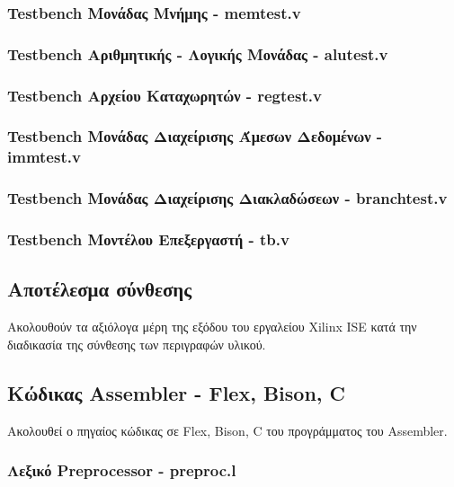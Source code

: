 \documentclass[11pt]{extarticle}
\begin{document}
\subsubsection{Testbench Μονάδας Μνήμης - memtest.v}

\newpage
\subsubsection{Testbench Αριθμητικής - Λογικής Μονάδας - alutest.v}


\subsubsection{Testbench Αρχείου Καταχωρητών - regtest.v}


\subsubsection{Testbench Μονάδας Διαχείρισης Άμεσων Δεδομένων - immtest.v}


\subsubsection{Testbench Μονάδας Διαχείρισης Διακλαδώσεων - branchtest.v}


\newpage
\subsubsection{Testbench Μοντέλου Επεξεργαστή - tb.v}


\subsection{Αποτέλεσμα σύνθεσης}
Ακολουθούν τα αξιόλογα μέρη της εξόδου του εργαλείου Xilinx ISE κατά την διαδικασία της σύνθεσης των περιγραφών υλικού.


\subsection{Κώδικας Assembler - Flex, Bison, C}
Ακολουθεί ο πηγαίος κώδικας σε Flex, Bison, C του προγράμματος του Assembler.
\subsubsection{Λεξικό Preprocessor - preproc.l}

\end{document}
